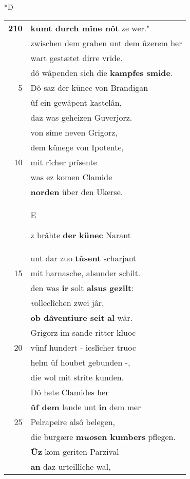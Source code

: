 \documentclass[8pt,a4paper,notitlepage]{article}
\begin{document}
\begin{table}[ht]
\begin{minipage}[t]{0.5\linewidth}
\small
\begin{center}*D
\end{center}
\begin{tabular}{rl}
\textbf{210} & \textbf{kumt durch mîne nôt} ze wer."\\ 
 & zwischen dem graben unt dem ûzerem her\\ 
 & wart gestætet dirre vride.\\ 
 & dô wâpenden sich die \textbf{kampfes smide}.\\ 
5 & Dô saz der künec von Brandigan\\ 
 & ûf ein gewâpent kastelân,\\ 
 & daz was geheizen Guverjorz.\\ 
 & von sîme neven Grigorz,\\ 
 & dem künege von Ipotente,\\ 
10 & mit rîcher prîsente\\ 
 & was ez komen Clamide\\ 
 & \textbf{norden} über den Ukerse.\\ 
 & \begin{large}E\end{large}z brâhte \textbf{der} \textbf{künec} Narant\\ 
 & unt dar zuo \textbf{tûsent} scharjant\\ 
15 & mit harnasche, alsunder schilt.\\ 
 & den was \textbf{ir} solt \textbf{alsus} \textbf{gezilt}:\\ 
 & \textit{v}olleclîchen zwei jâr,\\ 
 & \textbf{ob dâventiure seit} \textbf{al} wâr.\\ 
 & Grigorz im sande ritter kluoc\\ 
20 & vünf hundert - ieslîcher truoc\\ 
 & helm ûf houbet gebunden -,\\ 
 & die wol mit strîte kunden.\\ 
 & Dô hete Clamides her\\ 
 & \textbf{ûf dem} lande unt \textbf{in} dem mer\\ 
25 & Pelrapeire alsô belegen,\\ 
 & die burgære \textbf{m\textit{uo}sen kumbers} pflegen.\\ 
 & \textbf{Ûz} kom geriten Parzival\\ 
 & \textbf{an} daz urteillîche wal,\\ 

\end{tabular}
\end{minipage}
\end{table}
\end{document}

